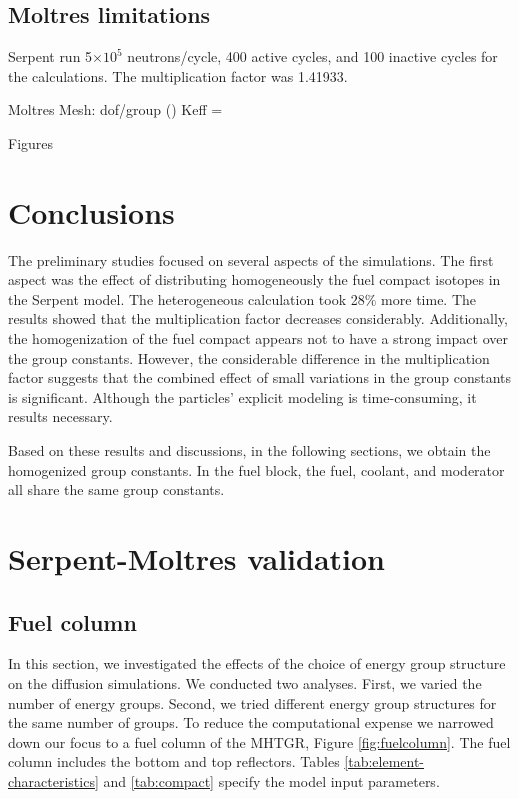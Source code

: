 \documentclass[11pt,letterpaper]{article}
\begin{document}
\subsection{Moltres limitations}

Serpent run 5$\times 10^5$ neutrons/cycle, 400 active cycles, and 100 inactive cycles for the calculations.
The multiplication factor was 1.41933.

Moltres
Mesh: dof/group ()
Keff = 

Figures

\section{Conclusions}

The preliminary studies focused on several aspects of the simulations.
The first aspect was the effect of distributing homogeneously the fuel compact isotopes in the Serpent model.
The heterogeneous calculation took 28$\%$ more time.
The results showed that the multiplication factor decreases considerably.
Additionally, the homogenization of the fuel compact appears not to have a strong impact over the group constants.
However, the considerable difference in the multiplication factor suggests that the combined effect of small variations in the group constants is significant.
Although the particles’ explicit modeling is time-consuming, it results necessary.




Based on these results and discussions, in the following sections, we obtain the homogenized group constants.
In the fuel block, the fuel, coolant, and moderator all share the same group constants.

\section{Serpent-Moltres validation}

\subsection{Fuel column}

In this section, we investigated the effects of the choice of energy group structure on the diffusion simulations.
We conducted two analyses.
First, we varied the number of energy groups.
Second, we tried different energy group structures for the same number of groups.
To reduce the computational expense we narrowed down our focus to a fuel column of the MHTGR, Figure \ref{fig:fuelcolumn}.
The fuel column includes the bottom and top reflectors.
Tables \ref{tab:element-characteristics} and \ref{tab:compact} specify the model input parameters.
\end{document}
